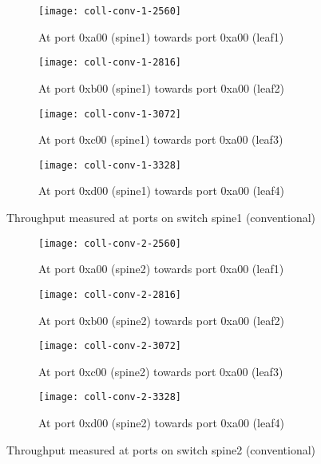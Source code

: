 \begin{figure}
    \centering
    \begin{subfigure}{.45\linewidth}
        \texttt{[image: coll-conv-1-2560]}
        \caption{At port 0xa00 (spine1) \newline towards port 0xa00 (leaf1)}%
        \label{fig:spine1-leaf1-conv}
    \end{subfigure}
    \begin{subfigure}{.45\linewidth}
        \texttt{[image: coll-conv-1-2816]}
        \caption{At port 0xb00 (spine1) \newline towards port 0xa00 (leaf2)}%
        \label{fig:spine1-leaf2-conv}
    \end{subfigure}
    \begin{subfigure}{.45\linewidth}
        \texttt{[image: coll-conv-1-3072]}
        \caption{At port 0xc00 (spine1) \newline towards port 0xa00 (leaf3)}%
        \label{fig:spine1-leaf3-conv}
    \end{subfigure}
    \begin{subfigure}{.45\linewidth}
        \texttt{[image: coll-conv-1-3328]}
        \caption{At port 0xd00 (spine1) \newline towards port 0xa00 (leaf4)}%
        \label{fig:spine1-leaf4-conv}
    \end{subfigure}
    \caption{Throughput measured at ports on switch spine1 (conventional)}%
    \label{fig:coll-spine1-conv}
\end{figure}

\begin{figure}
    \begin{subfigure}{.45\linewidth}
        \texttt{[image: coll-conv-2-2560]}
        \caption{At port 0xa00 (spine2) \newline towards port 0xa00 (leaf1)}%
        \label{fig:spine2-leaf1-conv}
    \end{subfigure}
    \begin{subfigure}{.45\linewidth}
        \texttt{[image: coll-conv-2-2816]}
        \caption{At port 0xb00 (spine2) \newline towards port 0xa00 (leaf2)}%
        \label{fig:spine2-leaf2-conv}
    \end{subfigure}
    \begin{subfigure}{.45\linewidth}
        \texttt{[image: coll-conv-2-3072]}
        \caption{At port 0xc00 (spine2) \newline towards port 0xa00 (leaf3)}%
        \label{fig:spine2-leaf3-conv}
    \end{subfigure}
    \begin{subfigure}{.45\linewidth}
        \texttt{[image: coll-conv-2-3328]}
        \caption{At port 0xd00 (spine2) \newline towards port 0xa00 (leaf4)}%
        \label{fig:spine2-leaf4-conv}
    \end{subfigure}
    \caption{Throughput measured at ports on switch spine2 (conventional)}%
    \label{fig:coll-spine2-conv}
\end{figure}


